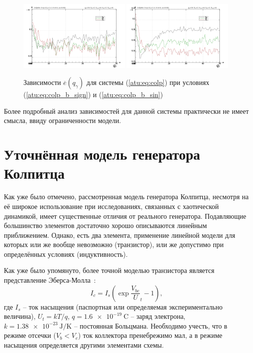 \begin{figure}[htb!]
\centerline{
  \includegraphics[width=0.49\textwidth]{p/mod/colp_m5p-p_qg_e_sign.png}
  \includegraphics[width=0.49\textwidth]{p/mod/colp_m5p-p_qg_e_sin.png}
}
  \caption{Зависимости  $\overline{e}(q_\gamma)$ для системы (\ref{atu:eq:colp})
  при условиях (\ref{atu:eq:colp_b_sign}) и (\ref{atu:eq:colp_b_sin})
}
\label{atu:f:colp_e_qgamma}
\end{figure}

Более подробный анализ зависимостей для данной системы практически не имеет смысла,
ввиду ограниченности модели.







\section{Уточнённая модель генератора Колпитца}  %

Как уже было отмечено,
рассмотренная  модель
генератора Колпитца, несмотря на её широкое использование
при исследованиях, связанных с хаотической динамикой,
имеет существенные отличия от реального генератора.
Подавляющие большинство элементов достаточно хорошо описываются линейным
приближением. Однако, есть два элемента,
применение линейной модели для которых или же вообще невозможно (транзистор),
или же допустимо при определённых условиях (индуктивность).

Как уже было упомянуто, более точной моделью транзистора является представление
Эберса-Молла~\cite{horowitz}:
%
\begin{equation}
  I_c = I_s \left( \exp\frac{V_{be}}U_t{} - 1 \right),
  \label{atu:eq:ebers-moll}
\end{equation}
%
где
$I_s$ -- ток насыщения (паспортная или определяемая экспериментально величина),
$U_t=kT/q$,
$q = \SI{1.6e-19}{\coulomb}$ -- заряд электрона,
$k = \SI{1.38e-23}{\joule/\kelvin}$ -- постоянная Больцмана.
Необходимо учесть, что в режиме отсечки ($V_b < V_e$) ток коллектора пренебрежимо мал,
а в режиме насыщения определяется другими элементами схемы.



